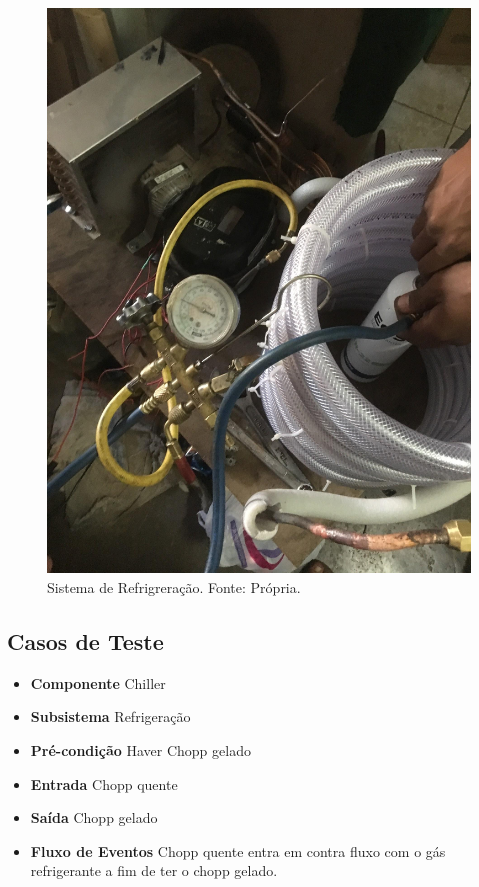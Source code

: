                 \begin{figure}[!htb]
                    \centering
                    \includegraphics[scale= 0.2]{figuras/recarga-gas.png}
                    \caption{Sistema de Refrigreração. Fonte: Própria.}
                    \label{sistema-refrigeracao}
                \end{figure}

        \subsection[Casos de Teste]{Casos de Teste}
            \begin{itemize}
                \item \textbf{Componente} Chiller
                \item \textbf{Subsistema} Refrigeração
                \item \textbf{Pré-condição} Haver Chopp gelado
                \item \textbf{Entrada} Chopp quente
                \item \textbf{Saída} Chopp gelado
                \item \textbf{Fluxo de Eventos} Chopp quente entra em contra fluxo com o gás refrigerante a fim de
                    ter o chopp gelado.
            \end{itemize}

